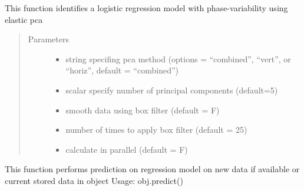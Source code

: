 \documentclass[letterpaper,10pt,english]{sphinxmanual}
\begin{document}
\begin{fulllineitems}
\begin{fulllineitems}
\label{\detokenize{pcr_regression:pcr_regression.elastic_lpcr_regression.calc_model}}
This function identifies a logistic regression model with phase-variability
using elastic pca
\begin{quote}\begin{description}
\item[{Parameters}] \leavevmode\begin{itemize}
\item {} 
 \textendash{} string specifing pca method (options = “combined”,
“vert”, or “horiz”, default = “combined”)

\item {} 
 \textendash{} scalar specify number of principal components (default=5)

\item {} 
 \textendash{} smooth data using box filter (default = F)

\item {} 
 \textendash{} number of times to apply box filter (default = 25)

\item {} 
 \textendash{} calculate in parallel (default = F)

\end{itemize}

\end{description}\end{quote}

\end{fulllineitems}


\begin{fulllineitems}
\label{\detokenize{pcr_regression:pcr_regression.elastic_lpcr_regression.predict}}
This function performs prediction on regression model on new data if available or current stored data in object
Usage:  obj.predict()
\begin{quote}


\end{quote}
\end{fulllineitems}
\end{fulllineitems}
\end{document}
